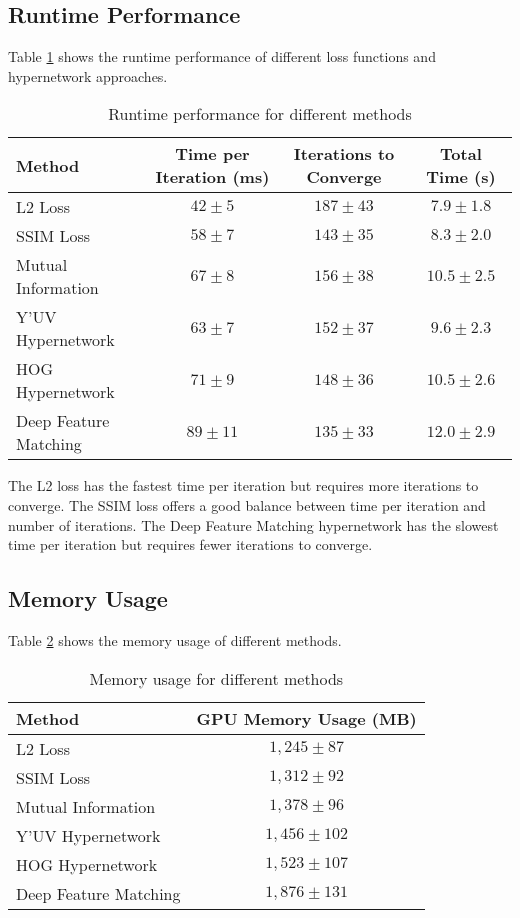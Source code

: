 \subsection{Runtime Performance}
Table \ref{tab:runtime} shows the runtime performance of different loss functions and hypernetwork approaches.

\begin{table}[h]
\centering
\caption{Runtime performance for different methods}
\label{tab:runtime}
\begin{tabular}{lccc}
\toprule
\textbf{Method} & \textbf{Time per Iteration (ms)} & \textbf{Iterations to Converge} & \textbf{Total Time (s)} \\
\midrule
L2 Loss & $42 \pm 5$ & $187 \pm 43$ & $7.9 \pm 1.8$ \\
SSIM Loss & $58 \pm 7$ & $143 \pm 35$ & $8.3 \pm 2.0$ \\
Mutual Information & $67 \pm 8$ & $156 \pm 38$ & $10.5 \pm 2.5$ \\
Y'UV Hypernetwork & $63 \pm 7$ & $152 \pm 37$ & $9.6 \pm 2.3$ \\
HOG Hypernetwork & $71 \pm 9$ & $148 \pm 36$ & $10.5 \pm 2.6$ \\
Deep Feature Matching & $89 \pm 11$ & $135 \pm 33$ & $12.0 \pm 2.9$ \\
\bottomrule
\end{tabular}
\end{table}

The L2 loss has the fastest time per iteration but requires more iterations to converge. The SSIM loss offers a good balance between time per iteration and number of iterations. The Deep Feature Matching hypernetwork has the slowest time per iteration but requires fewer iterations to converge.

\subsection{Memory Usage}
Table \ref{tab:memory} shows the memory usage of different methods.

\begin{table}[h]
\centering
\caption{Memory usage for different methods}
\label{tab:memory}
\begin{tabular}{lc}
\toprule
\textbf{Method} & \textbf{GPU Memory Usage (MB)} \\
\midrule
L2 Loss & $1,245 \pm 87$ \\
SSIM Loss & $1,312 \pm 92$ \\
Mutual Information & $1,378 \pm 96$ \\
Y'UV Hypernetwork & $1,456 \pm 102$ \\
HOG Hypernetwork & $1,523 \pm 107$ \\
Deep Feature Matching & $1,876 \pm 131$ \\
\bottomrule
\end{tabular}
\end{table}

